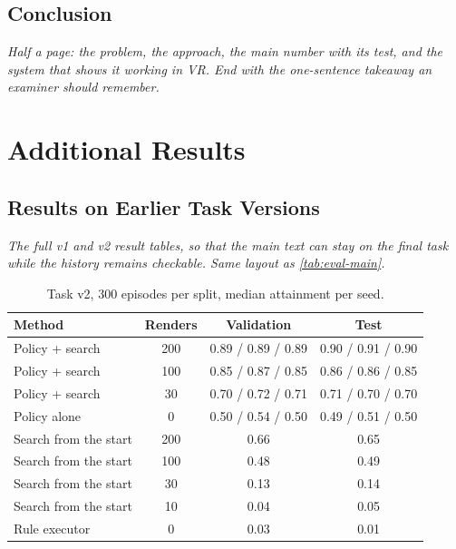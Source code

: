 \documentclass[12pt, a4paper]{book}
\newcommand{\plan}[1]{{\color{gray}\itshape #1\par}}
\begin{document}
\section{Conclusion}
\label{sec:conclusion}
\plan{Half a page: the problem, the approach, the main number with its test, and the system that shows it working in VR. End with the one-sentence takeaway an examiner should remember.}



\appendix

\chapter{Additional Results}
\label{app:results}

\section{Results on Earlier Task Versions}
\label{app:task-versions}
\plan{The full v1 and v2 result tables, so that the main text can stay on the final task while the history remains checkable. Same layout as \cref{tab:eval-main}.}

\begin{table}[ht]
  \centering
  \small
  \caption[Results on task v2]{Task v2, 300 episodes per split, median attainment per seed.}
  \label{tab:app-v2}
  \begin{tabular}{lccc}
    \toprule
    Method & Renders & Validation & Test \\
    \midrule
    Policy + search & 200 & 0.89 / 0.89 / 0.89 & 0.90 / 0.91 / 0.90 \\
    Policy + search & 100 & 0.85 / 0.87 / 0.85 & 0.86 / 0.86 / 0.85 \\
    Policy + search & 30  & 0.70 / 0.72 / 0.71 & 0.71 / 0.70 / 0.70 \\
    Policy alone & 0 & 0.50 / 0.54 / 0.50 & 0.49 / 0.51 / 0.50 \\
    Search from the start & 200 & 0.66 & 0.65 \\
    Search from the start & 100 & 0.48 & 0.49 \\
    Search from the start & 30 & 0.13 & 0.14 \\
    Search from the start & 10 & 0.04 & 0.05 \\
    Rule executor & 0 & 0.03 & 0.01 \\
    \bottomrule
  \end{tabular}
\end{table}
\end{document}
